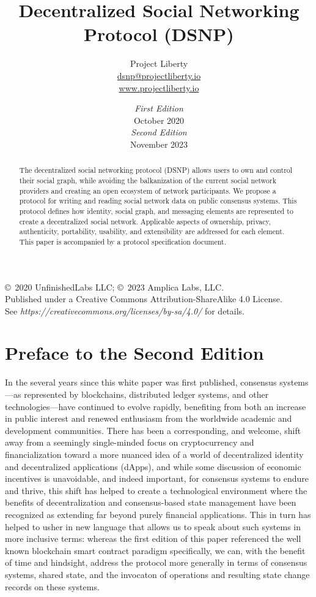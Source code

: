 \documentclass[12pt,letterpaper]{article}
\title{Decentralized Social Networking Protocol (DSNP)}
\author{
	Project Liberty\\
	\href{mailto:dsnp@projectliberty.io}{dsnp@projectliberty.io}\\
	\url{www.projectliberty.io}
}
\date{\textit{First Edition}\\
October 2020\\
\textit{Second Edition}\\
November 2023}
\begin{document}
\maketitle

\begin{abstract}
	The decentralized social networking protocol (DSNP) allows users to own and control
	their social graph, while avoiding the balkanization of the current social network
	providers and creating an open ecosystem of network participants. We propose a protocol
	for writing and reading social network data on public consensus systems.
	This protocol defines how identity, social graph, and messaging elements are represented
	to create a decentralized social network. Applicable aspects of ownership, privacy,
	authenticity, portability, usability, and extensibility are addressed for each element.
	This paper is accompanied by a protocol specification document.
\end{abstract}

\vfill
\copyright\, 2020 UnfinishedLabs LLC; \copyright\, 2023 Amplica Labs, LLC.\\
Published under a Creative Commons Attribution-ShareAlike 4.0 License.\\
See \textit{https://creativecommons.org/licenses/by-sa/4.0/} for details.

\thispagestyle{empty}
\clearpage

\raggedright

\section*{Preface to the Second Edition}

In the several years since this white paper was first published, consensus systems---as
represented by blockchains, distributed ledger systems, and other technologies---have
continued to evolve rapidly, benefiting from both an increase in public interest and renewed
enthusiasm from the worldwide academic and development communities. There has been a
corresponding, and welcome, shift away from a seemingly single-minded focus on
cryptocurrency and financialization toward a more nuanced idea of a world of decentralized
identity and decentralized applications (dApps), and while some discussion of economic
incentives is unavoidable, and indeed important, for consensus systems to endure and thrive,
this shift has helped to create a technological environment where the benefits of
decentralization and consensus-based state management have been recognized as extending far
beyond purely financial applications. This in turn has helped to usher in new language that
allows us to speak about such systems in more inclusive terms: whereas the first edition of
this paper referenced the well known blockchain smart contract paradigm specifically, we
can, with the benefit of time and hindsight, address the protocol more generally in terms of
consensus systems, shared state, and the invocaton of operations and resulting state change
records on these systems.
\end{document}
